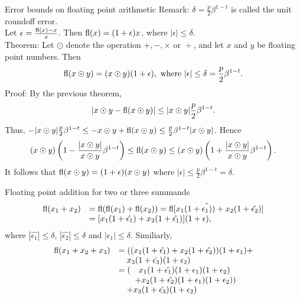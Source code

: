 \documentclass{beamer}
\begin{document}
\begin{frame}{Error bounds on floating point arithmetic}
Remark: $\delta = \frac{p}{2} \beta^{1-t}$ is called the unit roundoff error.\\
Let $\epsilon = \frac{\text{fl}(x) - x}{x}$. Then $\text{fl}(x) = (1 + \epsilon) x$, where $|\epsilon| \leq \delta$.\\
Theorem: Let $\odot$ denote the operation $+, -, \times \text{ or } \div$, and let $x$ and $y$ be
floating point numbers. Then
\begin{equation*}
\text{fl}(x \odot y) = (x \odot y)(1 + \epsilon), \text{ where } |\epsilon| \leq \delta = \frac{p}{2} \beta^{1-t}.
\end{equation*}
Proof: By the previous theorem,
\begin{equation*}
|x \odot y - \text{fl}(x \odot y)| \leq |x \odot y| \frac{p}{2} \beta^{1-t}.
\end{equation*}
Thus, $-|x \odot y| \frac{p}{2} \beta^{1 - t} \leq -x \odot y + \text{fl}(x \odot y) \leq \frac{p}{2} \beta^{1 - t} |x \odot y|$.
Hence
\begin{equation*}
(x \odot y)\left(1 - \frac{|x \odot y|}{x \odot y} \beta^{1-t} \right) \leq \text{fl}(x \odot y) \leq 
(x \odot y)\left(1 + \frac{|x \odot y|}{x \odot y} \beta^{1-t}\right).
\end{equation*}
It follows that $\text{fl}(x \odot y) = (1 + \epsilon) (x \odot y)$ where
$|\epsilon| \leq \frac{p}{2} \beta^{1-t} = \delta$.
\end{frame}


\begin{frame}{Floating point addition for two or three summands}
\begin{equation*}
\begin{array}{rl}
\text{fl}(x_1 + x_2) &= \text{fl}(\text{fl}(x_1) + \text{fl}(x_2)) = \text{fl}[x_1(1 + \hat{\epsilon_1)}) + x_2(1 + \hat{\epsilon_2})] \\
&= [x_1 (1 + \hat{\epsilon_1}) + x_2 (1 + \hat{\epsilon_1})] (1 + \epsilon),
\end{array}
\end{equation*}
where
$|\hat{\epsilon_1}| \leq \delta$, $|\hat{\epsilon_2}| \leq \delta$ and $|\epsilon_1| \leq \delta$. Similiarly,
\begin{equation*}
\begin{array}{rl}
\text{fl}(x_1 + x_2 + x_3) &= ((x_1 (1 + \hat{\epsilon_1}) + x_2 (1 + \hat{\epsilon_2}))(1 + \epsilon_1) + \\
& \quad x_3 (1 + \hat{\epsilon_3})(1 + \epsilon_2) \\
& = (\quad x_1 (1 + \hat{\epsilon_1}) (1 + \epsilon_1) (1 + \epsilon_2) \\
	&\qquad + x_2 (1 + \hat{\epsilon_2}) (1 + \epsilon_1) (1 + \epsilon_2)) \\
	&\quad + x_3 (1 + \hat{\epsilon_3}) (1 + \epsilon_2)
\end{array}
\end{equation*}
\end{frame}
\end{document}
